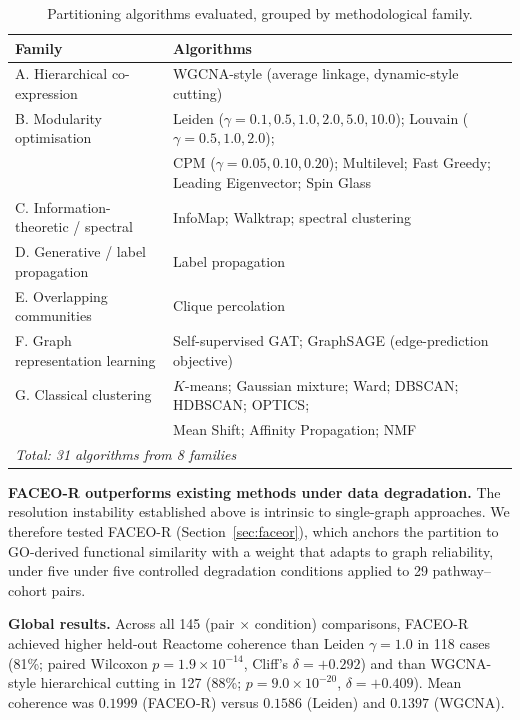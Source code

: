 \documentclass[twocolumn,10pt,a4paper]{article}
\begin{document}
\begin{table}[t]
\centering
\caption{Partitioning algorithms evaluated, grouped by methodological family.}
\label{tab:algos}
\small
\begin{tabular}{ll}
\toprule
Family & Algorithms \\
\midrule
A. Hierarchical co-expression & WGCNA-style (average linkage, dynamic-style cutting) \\
B. Modularity optimisation & Leiden ($\gamma=0.1,0.5,1.0,2.0,5.0,10.0$); Louvain ($\gamma=0.5,1.0,2.0$); \\
 & CPM ($\gamma=0.05,0.10,0.20$); Multilevel; Fast Greedy; Leading Eigenvector; Spin Glass \\
C. Information-theoretic / spectral & InfoMap; Walktrap; spectral clustering \\
D. Generative / label propagation & Label propagation \\
E. Overlapping communities & Clique percolation \\
F. Graph representation learning & Self-supervised GAT; GraphSAGE (edge-prediction objective) \\
G. Classical clustering & $K$-means; Gaussian mixture; Ward; DBSCAN; HDBSCAN; OPTICS; \\
 & Mean Shift; Affinity Propagation; NMF \\
\midrule
\multicolumn{2}{l}{\emph{Total: 31 algorithms from 8 families}} \\
\bottomrule
\end{tabular}
\end{table}

\noindent\textbf{FACEO-R outperforms existing methods under data degradation.} The resolution instability established above is intrinsic to single-graph approaches. We
therefore tested FACEO-R (Section~\ref{sec:faceor}), which anchors the partition to
GO-derived functional similarity with a weight that adapts to graph reliability, under five
under five controlled degradation conditions applied to 29 pathway--cohort pairs.

\noindent\textbf{Global results.} Across all 145 (pair $\times$ condition) comparisons,
FACEO-R achieved higher held-out Reactome coherence than Leiden $\gamma=1.0$ in 118 cases
(81\%; paired Wilcoxon $p = 1.9\times10^{-14}$, Cliff's $\delta = +0.292$) and than
WGCNA-style hierarchical cutting in 127 (88\%; $p = 9.0\times10^{-20}$,
$\delta = +0.409$). Mean coherence was $0.1999$ (FACEO-R) versus $0.1586$ (Leiden) and
$0.1397$ (WGCNA).
\end{document}
